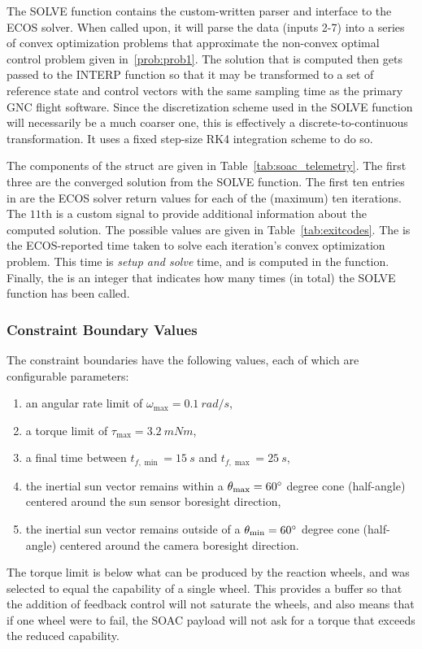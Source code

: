 \documentclass[10pt]{article}
\begin{document}
The SOLVE function contains the custom-written parser and interface to the ECOS solver. When called upon, it will parse the data (inputs 2-7) into a series of convex optimization problems that approximate the non-convex optimal control problem given in~\ref{prob:prob1}. The solution that is computed then gets passed to the INTERP function so that it may be transformed to a set of reference state and control vectors with the same sampling time as the primary GNC flight software. Since the discretization scheme used in the SOLVE function will necessarily be a much coarser one, this is effectively a discrete-to-continuous transformation. It uses a fixed step-size RK4 integration scheme to do so. 

The components of the  struct are given in Table~\ref{tab:soac_telemetry}. The first three are the converged solution from the SOLVE function. The first ten entries in  are the ECOS solver return values for each of the (maximum) ten iterations. The $11$th is a custom signal to provide additional information about the computed solution. The possible values are given in Table~\ref{tab:exitcodes}. The  is the ECOS-reported time taken to solve each iteration's convex optimization problem. This time is \textit{setup and solve} time, and is computed in the  function. Finally, the  is an integer that indicates how many times (in total) the SOLVE function has been called.

\subsubsection{Constraint Boundary Values}

The constraint boundaries have the following values, each of which are configurable parameters:
\begin{enumerate}
\item an angular rate limit of $\omega_{\max} = 0.1~\unit{rad/s}$,
\item a torque limit of $\tau_{\max} = 3.2~\unit{mNm}$,
\item a final time between $t_{f,\min}=15~\unit{s}$ and $t_{f,\max}=25~\unit{s}$,
\item the inertial sun vector remains within a $\theta_{\max}=60\mathrm{^{\circ}}$ degree cone (half-angle) centered around the sun sensor boresight direction,
\item the inertial sun vector remains outside of a $\theta_{\min}=60\mathrm{^{\circ}}$ degree cone (half-angle) centered around the camera boresight direction. 
\end{enumerate} 
The torque limit is below what can be produced by the reaction wheels, and was selected to equal the capability of a single wheel. This provides a buffer so that the addition of feedback control will not saturate the wheels, and also means that if one wheel were to fail, the SOAC payload will not ask for a torque that exceeds the reduced capability.
\end{document}
